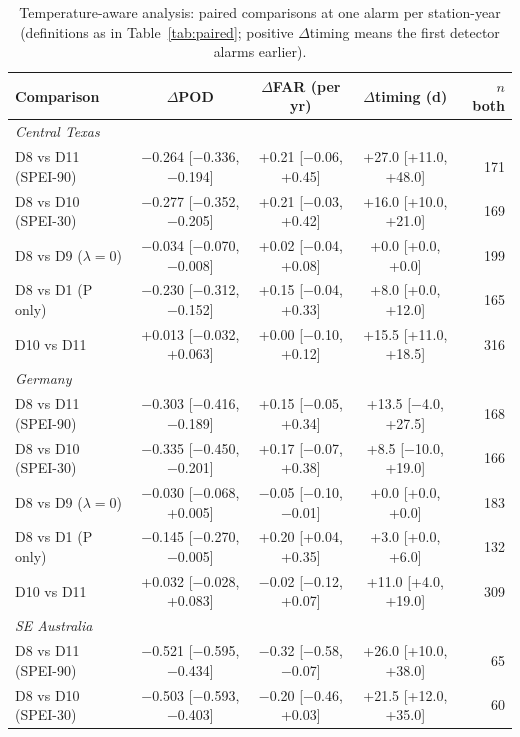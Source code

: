 \begin{table}[tbp]
\caption{Temperature-aware analysis: paired comparisons at one alarm per station-year (definitions as in
Table~\ref{tab:paired}; positive $\Delta$timing means the first detector alarms earlier).}
\label{tab:pairedmv}
\footnotesize\setlength{\tabcolsep}{2.5pt}
\begin{tabular*}{\textwidth}{@{\extracolsep\fill}lcccr}
\toprule
Comparison & $\Delta$POD & $\Delta$FAR (per yr) & $\Delta$timing (d) & $n$ both\\
\midrule
\multicolumn{5}{l}{\textit{Central Texas}}\\
\quad D8 vs D11 (SPEI-90) & $-$0.264 [$-$0.336, $-$0.194] & +0.21 [$-$0.06, +0.45] & +27.0 [+11.0, +48.0] & 171 \\
\quad D8 vs D10 (SPEI-30) & $-$0.277 [$-$0.352, $-$0.205] & +0.21 [$-$0.03, +0.42] & +16.0 [+10.0, +21.0] & 169 \\
\quad D8 vs D9 ($\lambda=0$) & $-$0.034 [$-$0.070, $-$0.008] & +0.02 [$-$0.04, +0.08] & +0.0 [+0.0, +0.0] & 199 \\
\quad D8 vs D1 (P only) & $-$0.230 [$-$0.312, $-$0.152] & +0.15 [$-$0.04, +0.33] & +8.0 [+0.0, +12.0] & 165 \\
\quad D10 vs D11 & +0.013 [$-$0.032, +0.063] & +0.00 [$-$0.10, +0.12] & +15.5 [+11.0, +18.5] & 316 \\
\midrule
\multicolumn{5}{l}{\textit{Germany}}\\
\quad D8 vs D11 (SPEI-90) & $-$0.303 [$-$0.416, $-$0.189] & +0.15 [$-$0.05, +0.34] & +13.5 [$-$4.0, +27.5] & 168 \\
\quad D8 vs D10 (SPEI-30) & $-$0.335 [$-$0.450, $-$0.201] & +0.17 [$-$0.07, +0.38] & +8.5 [$-$10.0, +19.0] & 166 \\
\quad D8 vs D9 ($\lambda=0$) & $-$0.030 [$-$0.068, +0.005] & $-$0.05 [$-$0.10, $-$0.01] & +0.0 [+0.0, +0.0] & 183 \\
\quad D8 vs D1 (P only) & $-$0.145 [$-$0.270, $-$0.005] & +0.20 [+0.04, +0.35] & +3.0 [+0.0, +6.0] & 132 \\
\quad D10 vs D11 & +0.032 [$-$0.028, +0.083] & $-$0.02 [$-$0.12, +0.07] & +11.0 [+4.0, +19.0] & 309 \\
\midrule
\multicolumn{5}{l}{\textit{SE Australia}}\\
\quad D8 vs D11 (SPEI-90) & $-$0.521 [$-$0.595, $-$0.434] & $-$0.32 [$-$0.58, $-$0.07] & +26.0 [+10.0, +38.0] & 65 \\
\quad D8 vs D10 (SPEI-30) & $-$0.503 [$-$0.593, $-$0.403] & $-$0.20 [$-$0.46, +0.03] & +21.5 [+12.0, +35.0] & 60 \\

\end{tabular*}
\end{table}
